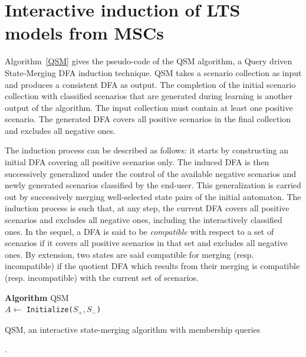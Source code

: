 \section{Interactive induction of LTS models from MSCs}

Algorithm~\ref{QSM} gives the pseudo-code of the \textsc{QSM} algorithm, a Query driven State-Merging DFA induction technique. \textsc{QSM} takes a scenario collection as input and produces a consistent DFA as output. The completion of the initial scenario collection with classified scenarios that are generated during learning is another output of the algorithm. The input collection must contain at least one positive scenario. The generated DFA covers all positive scenarios in the final collection and excludes all negative ones. 

The induction process can be described as follows: it starts by constructing an initial DFA covering all positive scenarios only. The induced DFA is then successively generalized under the control of the available negative scenarios and newly generated scenarios classified by the end-user. This generalization is carried out by successively merging well-selected state pairs of the initial automaton. The induction process is such that, at any step, the current DFA covers all positive scenarios and excludes all negative ones, including the interactively classified ones. In the sequel, a DFA is said to be \textsl{compatible} with respect to a set of scenarios if it covers all positive scenarios in that set and excludes all negative ones. By extension, two states are said compatible for merging (resp. incompatible) if the quotient DFA which results from their merging is compatible (resp. incompatible) with the current set of scenarios.

\begin{algorithm}[H]
{
\textbf{Algorithm} \textsc{QSM}\\
$A \leftarrow $ {\tt Initialize($S_+, S_-$)}\\
}
\caption{\textsc{QSM}, an interactive state-merging algorithm with membership queries\label{QSM}}.
\end{algorithm}

